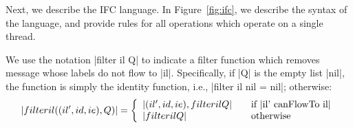 Next, we describe the IFC language.    In Figure~\ref{fig:ifc}, we describe the syntax
of the language, and provide rules for all operations which operate on a single
thread.  

We use the notation |filter il Q| to indicate a filter function which removes message whose labels do not
flow to |il|. Specifically, if |Q| is the empty list |nil|, the
function is simply the identity function, i.e.,
|filter il nil = nil|; otherwise:
\[
|filter il ((il', id, ie) , Q )| = \left\{
\begin{array}{l l}
|(il', id, ie) , filter il Q| & \quad \text{if |il' canFlowTo il|}\\
|filter il Q| & \quad \text{otherwise}
\end{array} \right.
\]



